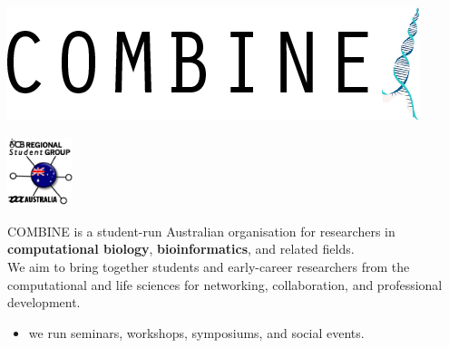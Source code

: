\documentclass[svgnames]{beamer}
\newcommand{\beamerpurple}[1]{{\usebeamercolor[fg]{title}#1}}
\begin{document}
\begin{frame}
    \vfill
    \begin{minipage}[c]{\linewidth}
        \centering
        \hfill
        \begin{minipage}[c]{0.45\linewidth}
            \centering
            \includegraphics[width=\linewidth]{./images/COMBINE-logo.png}
        \end{minipage}
        \begin{minipage}[c]{0.45\linewidth}
            \centering
            \includegraphics[height=20mm]{./images/RSGAU-logo.png}
        \end{minipage}
        \hfill
    \end{minipage}
    \vfill
    \beamerpurple{COMBINE} is a student-run Australian organisation for researchers in
    \textbf{computational biology}, \textbf{bioinformatics}, and related
    fields.\\[2ex]
    We aim to bring together students and early-career
    researchers from the computational and life sciences for networking,
    collaboration, and professional development.\\[1ex]
    \begin{itemize}
        \item we run seminars, workshops, symposiums, and social events.
    \end{itemize}
    \vfill
\end{frame}
\end{document}
